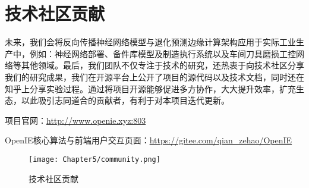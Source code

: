 \chapter{技术社区贡献}
未来，我们会将反向传播神经网络模型与退化预测边缘计算架构应用于实际工业生产中，例如：神经网络部署、备件库模型及制造执行系统以及车间刀具磨损工控网络等其他领域。最后，我们团队不仅专注于技术的研究，还热衷于向技术社区分享我们的研究成果，我们在开源平台上公开了项目的源代码以及技术文档，同时还在知乎上分享实验过程。通过将项目开源能够促进多方协作，大大提升效率，扩充生态，以此吸引志同道合的贡献者，有利于对本项目迭代更新。\par
项目官网：\href{http://www.openie.xyz:803}{http://www.openie.xyz:803} \par
OpenIE核心算法与前端用户交互页面：\href{https://gitee.com/qian_zehao/OpenIE}{https://gitee.com/qian\_zehao/OpenIE} \par
% 
\begin{figure}[htp]
    \centering
    \texttt{[image: Chapter5/community.png]}
    \caption{技术社区贡献}
\end{figure}